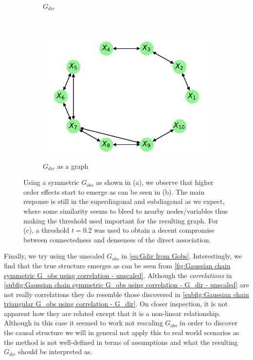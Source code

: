 \documentclass[../Thesis.tex]{subfiles}
\begin{document}
\begin{figure}[h]
\begin{subfigure}[t]{0.49\textwidth}
        \caption{$G_{dir}$}
        \label{subfig:Gaussian chain symmetric G_obs using correlation - G_dir}
    \end{subfigure}
    \\[\baselineskip]
    \begin{subfigure}[t]{0.49\textwidth}
        \centering
        \includegraphics[width=.9\linewidth]{figures/Gaussian Chain Theoretical/Chain graph from symmetric G obs.pdf}
        \caption{$G_{dir}$ as a graph}
    \end{subfigure}
    \caption{Using a symmetric $G_{obs}$ as shown in (a), we observe that higher order effects start to emerge as can be seen in (b). The main response is still in the superdiagonal and subdiagonal as we expect, where some similarity seems to bleed to nearby nodes/variables thus making the threshold used important for the resulting graph. For (c), a threshold $t=0.2$ was used to obtain a decent compromise between connectedness and denseness of the direct association.}
    \label{fig:Gaussian chain symmetric G_obs using correlation}
\end{figure}
Finally, we try using the unscaled $G_{obs}$ in \autoref{eq:Gdir from Gobs}. Interestingly, we find that the true structure emerges as can be seen from \autoref{fig:Gaussian chain symmetric G_obs using correlation - unscaled}. Although the \textit{correlations} in \autoref{subfig:Gaussian chain symmetric G_obs using correlation - G_dir - unscaled} are not really correlations they do resemble those discovered in \autoref{subfig:Gaussian chain triangular G_obs using correlation - G_dir}. On closer inspection, it is not apparent how they are related except that it is a non-linear relationship. Although in this case it seemed to work not rescaling $G_{obs}$ in order to discover the causal structure we will in general not apply this to real world scenarios as the method is not well-defined in terms of assumptions and what the resulting $G_{dir}$ should be interpreted as.
\end{document}
